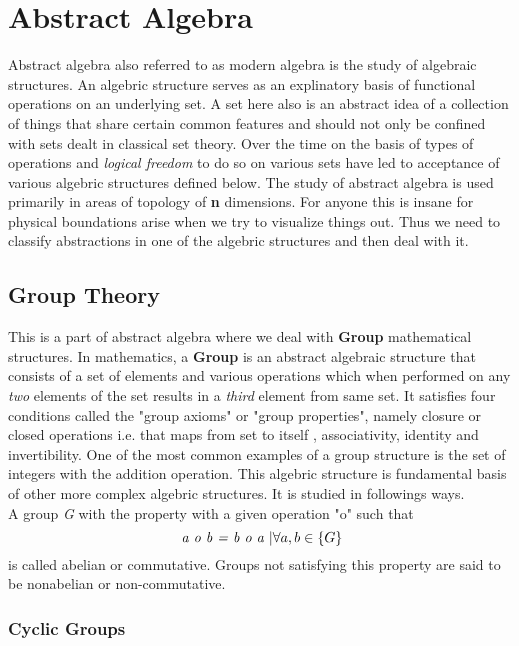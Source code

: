 \chapter{Abstract Algebra }

Abstract algebra also referred to as modern algebra is the study of algebraic structures. An algebric structure serves as an explinatory basis of functional operations on an underlying set. A set here also is an abstract idea of a collection of things that share certain common features and should not only be confined with sets dealt in classical set theory. Over the time on the basis of types of operations and \textit{logical freedom} to do so on various sets have led to acceptance of various algebric structures defined below. The study of abstract algebra is used primarily in areas of topology of \textbf{n} dimensions. For anyone this is insane for physical boundations arise when we try to visualize things out. Thus we need to classify abstractions in one of the algebric structures and then deal with it. 

\section{Group Theory}

This is a part of abstract algebra where we deal with \textbf{Group} mathematical structures. In mathematics, a \textbf{Group} is an abstract algebraic structure that consists of a set of elements and various operations which when performed on any \textit{two} elements of the set results in a \textit{third} element from same set. It satisfies four conditions called the "group axioms" or "group properties", namely closure or closed operations i.e. that maps from set to itself , associativity, identity and invertibility. One of the most common examples of a group structure is the set of integers with the addition operation. This algebric structure is fundamental basis of other more complex algebric structures. It is studied in followings ways.\\

A group \textit{G} with the property with a given operation "o" such that \[ \textit{ a o b = b o a }  | \hfill \forall a,b \in \{ G \} \] is called abelian or commutative. Groups not satisfying this property are said to be nonabelian or non-commutative.

\subsection{Cyclic Groups}

